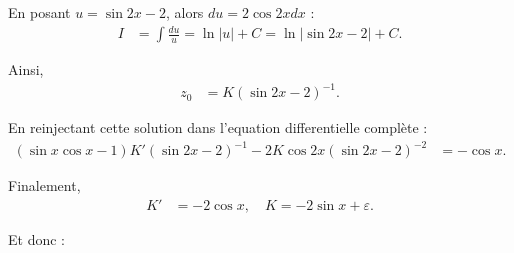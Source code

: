 En posant $u = \sin 2x - 2$, alors $du = 2 \cos 2x dx$ :
\begin{align*}
	I &= \int \frac{du}{u} = \ln |u| + C = \ln |\sin 2x - 2| + C.
\end{align*}

Ainsi,
\begin{align*}
	z_0 &= K (\sin 2x - 2)^{-1}.
\end{align*}

En reinjectant cette solution dans l’equation differentielle complète :
\begin{align*}
	(\sin x \cos x - 1) K' (\sin 2x - 2)^{-1} - 2K \cos 2x (\sin 2x - 2)^{-2} &= - \cos x.
\end{align*}

Finalement,
\begin{align*}
	K' &= -2 \cos x, \quad K = -2 \sin x + \varepsilon.
\end{align*}

Et donc :
